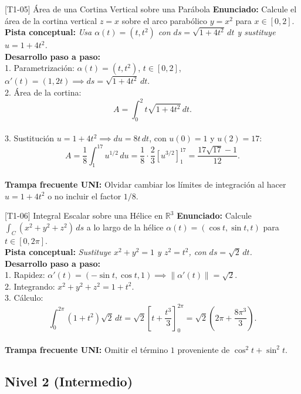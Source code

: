 \documentclass[11pt,a4paper]{article}
\begin{document}
\begin{ejerciciobox}{[T1-05] Área de una Cortina Vertical sobre una Parábola}
\textbf{Enunciado:} Calcule el área de la cortina vertical $z = x$ sobre el arco parabólico $y = x^2$ para $x \in [0, 2]$.\\[0.2cm]
\textbf{Pista conceptual:} \emph{Usa $\alpha(t) = (t, t^2)$ con $ds = \sqrt{1 + 4t^2}\,dt$ y sustituye $u = 1 + 4t^2$.}\\[0.2cm]
\textbf{Desarrollo paso a paso:}\\
1. Parametrización: $\alpha(t) = (t, t^2)$, $t \in [0, 2]$, $\alpha'(t) = (1, 2t) \implies ds = \sqrt{1 + 4t^2}\,dt$.\\
2. Área de la cortina:\\
$$A = \int_0^2 t\sqrt{1 + 4t^2}\,dt.$$\\
3. Sustitución $u = 1 + 4t^2 \implies du = 8t\,dt$, con $u(0)=1$ y $u(2)=17$:\\
$$A = \frac{1}{8}\int_1^{17} u^{1/2}\,du = \frac{1}{8}\cdot\frac{2}{3}\left[u^{3/2}\right]_1^{17} = \frac{17\sqrt{17} - 1}{12}.$$\\[0.2cm]
\textbf{Trampa frecuente UNI:} Olvidar cambiar los límites de integración al hacer $u = 1+4t^2$ o no incluir el factor $1/8$.
\end{ejerciciobox}

\begin{ejerciciobox}{[T1-06] Integral Escalar sobre una Hélice en $\mathbb{R}^3$}
\textbf{Enunciado:} Calcule $\int_C (x^2 + y^2 + z^2)\,ds$ a lo largo de la hélice $\alpha(t) = (\cos t, \sin t, t)$ para $t \in [0, 2\pi]$.\\[0.2cm]
\textbf{Pista conceptual:} \emph{Sustituye $x^2+y^2 = 1$ y $z^2 = t^2$, con $ds = \sqrt{2}\,dt$.}\\[0.2cm]
\textbf{Desarrollo paso a paso:}\\
1. Rapidez: $\alpha'(t) = (-\sin t, \cos t, 1) \implies \|\alpha'(t)\| = \sqrt{2}$.\\
2. Integrando: $x^2 + y^2 + z^2 = 1 + t^2$.\\
3. Cálculo:\\
$$\int_0^{2\pi} (1 + t^2)\sqrt{2}\,dt = \sqrt{2}\left[t + \frac{t^3}{3}\right]_0^{2\pi} = \sqrt{2}\left(2\pi + \frac{8\pi^3}{3}\right).$$\\[0.2cm]
\textbf{Trampa frecuente UNI:} Omitir el término $1$ proveniente de $\cos^2 t + \sin^2 t$.
\end{ejerciciobox}

\subsection{Nivel 2 (Intermedio)}
\end{document}
